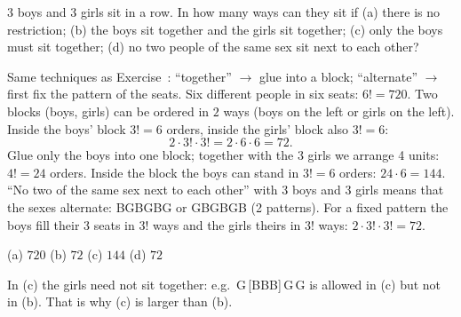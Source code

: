 
\begin{problem}
	3 boys and 3 girls sit in a row. In how many ways can they sit if (a) there
	is no restriction; (b) the boys sit together and the girls sit together;
	(c) only the boys must sit together; (d) no two people of the same sex sit
	next to each other?
\end{problem}

\begin{solution}
	\idea Same techniques as Exercise~:
	``together'' $\to$ glue into a block; ``alternate'' $\to$ first fix the
	pattern of the seats.
	 Six different people in six seats: $6!=720$.
	 Two blocks (boys, girls) can be ordered in $2$ ways (boys on the
	left or girls on the left). Inside the boys' block $3!=6$ orders, inside the
	girls' block also $3!=6$:
	\[ 2\cdot3!\cdot3!=2\cdot6\cdot6=72. \]
	 Glue only the boys into one block; together with the 3 girls we
	arrange 4 units: $4!=24$ orders. Inside the block the boys can stand in
	$3!=6$ orders: $24\cdot6=144$.
	 ``No two of the same sex next to each other'' with 3 boys and 3
	girls means that the sexes alternate: BGBGBG or GBGBGB (2 patterns). For a
	fixed pattern the boys fill their 3 seats in $3!$ ways and the girls theirs
	in $3!$ ways: $2\cdot3!\cdot3!=72$.
	\begin{answer}
		(a) $720$ \quad (b) $72$ \quad (c) $144$ \quad (d) $72$
	\end{answer}
	\begin{remark}
		In (c) the girls need not sit together: e.g.\ G\,[BBB]\,G\,G is allowed
		in (c) but not in (b). That is why (c) is larger than (b).
	\end{remark}
\end{solution}
